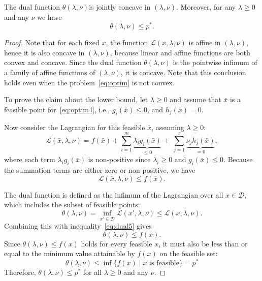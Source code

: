 \begin{lemma}\label{le:duallowerbound}
The dual function $\theta(\lambda,\nu)$is jointly concave in $(\lambda,\nu)$. Moreover, for any $\lambda \ge 0$  and any $\nu$ we have
\begin{equation}\label{eq:duallowerbound}
    \theta(\lambda,\nu) \le p^*.
\end{equation}
\end{lemma}
\begin{proof} 
Note that for each fixed $x$, the function $\mathcal{L}(x,\lambda,\nu)$ is affine in $(\lambda,\nu)$, hence it is also concave in $(\lambda,\nu)$, because linear and affine functions are both convex and concave.
Since the dual function $\theta(\lambda,\nu)$ is the pointwise infimum of a family of affine
functions of $(\lambda,\nu)$, it is concave. Note that this conclusion holds even when the problem~\eqref{eq:optim} is not convex.

To prove the claim  about the lower bound, let $\lambda \ge 0$ and
assume that $\bar{x}$ is a feasible point for~\eqref{eq:optim4}, i.e., $g_i(\bar{x})  \le 0$, and $h_j(\bar{x})  = 0$. 

Now consider the Lagrangian for this feasible $\bar{x}$, assuming $\lambda \ge 0$:
$${\mathcal L}(\bar{x}, \lambda, \nu) = f(\bar{x}) + \sum_{i=1}^m \underbrace{ \lambda_i g_i(\bar{x})}_{\le 0} \, +  \, \sum_{j=1}^r \underbrace{ \nu_j h_j(\bar{x})}_{= 0},$$
where each term $\lambda_i g_i(\bar{x})$ is non-positive since $\lambda_i \ge 0$ and $g_i(\bar{x}) \le 0$.
Because the summation terms are either zero or non-positive, we have
\begin{equation}\label{eq:dual5}
{\mathcal L}(\bar{x}, \lambda, \nu) \le f(\bar{x}).
\end{equation}


The dual function is defined as the infimum of the Lagrangian over all $x \in \mathcal{D}$, which includes the subset of feasible points:
$$\theta(\lambda, \nu) = \inf_{x' \in \mathcal{D}} {\mathcal L}(x', \lambda, \nu) \le {\mathcal L}(x, \lambda, \nu).$$
Combining this with inequality~\eqref{eq:dual5} gives
$$\theta(\lambda, \nu) \le f(x).$$
Since $\theta(\lambda, \nu) \le f(x)$ holds for every feasible $x$, it must also be less than or equal to the minimum value attainable by $f(x)$ on the feasible set:
$$\theta(\lambda, \nu) \le \inf \{ f(x) \mid x \text{ is feasible} \} = p^*$$
Therefore, $\theta(\lambda, \nu) \le p^*$ for all $\lambda \ge 0$ and any $\nu$.





\end{proof}

